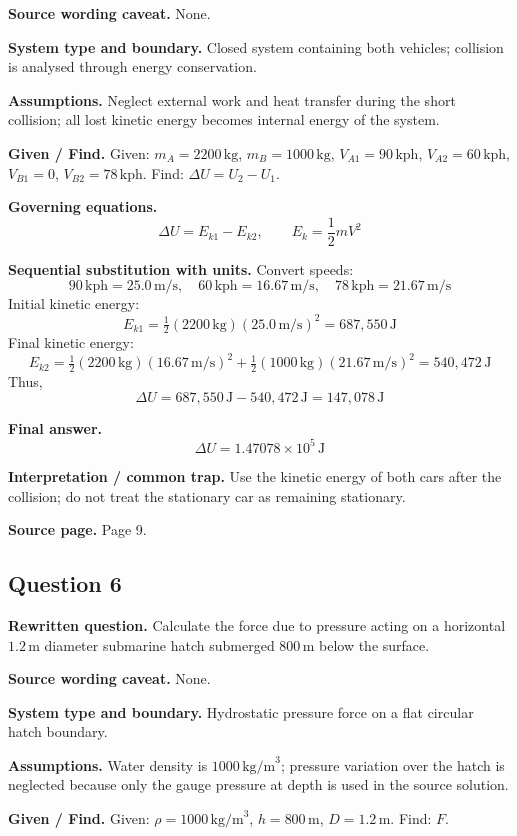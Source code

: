 \textbf{Source wording caveat.} None.

\textbf{System type and boundary.} Closed system containing both vehicles; collision is analysed through energy conservation.

\textbf{Assumptions.} Neglect external work and heat transfer during the short collision; all lost kinetic energy becomes internal energy of the system.

\textbf{Given / Find.}
Given: $m_A=2200\,\text{kg}$, $m_B=1000\,\text{kg}$, $V_{A1}=90\,\text{kph}$, $V_{A2}=60\,\text{kph}$, $V_{B1}=0$, $V_{B2}=78\,\text{kph}$.
Find: $\Delta U=U_2-U_1$.

\textbf{Governing equations.}
\[
\Delta U=E_{k1}-E_{k2},\qquad E_k=\frac12 mV^2
\]

\textbf{Sequential substitution with units.}
Convert speeds:
\[
90\,\text{kph}=25.0\,\text{m/s},\quad 60\,\text{kph}=16.67\,\text{m/s},\quad 78\,\text{kph}=21.67\,\text{m/s}
\]
Initial kinetic energy:
\[
E_{k1}=\tfrac12(2200\,\text{kg})(25.0\,\text{m/s})^2=687{,}550\,\text{J}
\]
Final kinetic energy:
\[
E_{k2}=\tfrac12(2200\,\text{kg})(16.67\,\text{m/s})^2+\tfrac12(1000\,\text{kg})(21.67\,\text{m/s})^2=540{,}472\,\text{J}
\]
Thus,
\[
\Delta U=687{,}550\,\text{J}-540{,}472\,\text{J}=147{,}078\,\text{J}
\]

\textbf{Final answer.}
\[
\boxed{\Delta U=1.47078\times10^5\,\text{J}}
\]

\textbf{Interpretation / common trap.} Use the kinetic energy of both cars after the collision; do not treat the stationary car as remaining stationary.

\textbf{Source page.} Page 9.

\subsection*{Question 6}
\textbf{Rewritten question.} Calculate the force due to pressure acting on a horizontal $1.2\,\text{m}$ diameter submarine hatch submerged $800\,\text{m}$ below the surface.

\textbf{Source wording caveat.} None.

\textbf{System type and boundary.} Hydrostatic pressure force on a flat circular hatch boundary.

\textbf{Assumptions.} Water density is $1000\,\text{kg/m}^3$; pressure variation over the hatch is neglected because only the gauge pressure at depth is used in the source solution.

\textbf{Given / Find.}
Given: $\rho=1000\,\text{kg/m}^3$, $h=800\,\text{m}$, $D=1.2\,\text{m}$.
Find: $F$.

